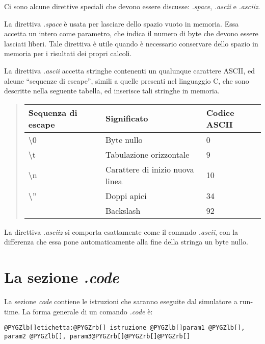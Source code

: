 \documentclass[letterpaper,10pt,english]{sphinxmanual}
\begin{document}
Ci sono alcune direttive speciali che devono essere discusse: \emph{.space},
\emph{.ascii} e \emph{.asciiz}.

La direttiva \emph{.space} è usata per lasciare dello spazio vuoto in memoria.
Essa accetta un intero come parametro, che indica il numero di byte che devono
essere lasciati liberi.  Tale direttiva è utile quando è necessario conservare
dello spazio in memoria per i risultati dei propri calcoli.

La direttiva \emph{.ascii} accetta stringhe contenenti un qualunque carattere
ASCII, ed alcune ``sequenze di escape'', simili a quelle presenti nel linguaggio
C, che sono descritte nella seguente tabella, ed inserisce tali stringhe in
memoria.
\begin{quote}

\begin{tabulary}{\linewidth}{|L|L|L|}
\hline
\textbf{
Sequenza di escape
} & \textbf{
Significato
} & \textbf{
Codice ASCII
}\\
\hline

\textbackslash{}0
 & 
Byte nullo
 & 
0
\\

\textbackslash{}t
 & 
Tabulazione orizzontale
 & 
9
\\

\textbackslash{}n
 & 
Carattere di inizio nuova linea
 & 
10
\\

\textbackslash{}''
 & 
Doppi apici
 & 
34
\\
 & 
Backslash
 & 
92
\\
\hline
\end{tabulary}

\end{quote}

La direttiva \emph{.asciiz} si comporta esattamente come il comando \emph{.ascii}, con
la differenza che essa pone automaticamente alla fine della stringa un byte
nullo.


\section{La sezione \emph{.code}}
\label{source-files-format:la-sezione-code}
La sezione \emph{code} contiene le istruzioni che saranno eseguite dal
simulatore a run-time. La forma generale di un comando \emph{.code} è:

\begin{Verbatim}[commandchars=@\[\]]
@PYGZlb[]etichetta:@PYGZrb[] istruzione @PYGZlb[]param1 @PYGZlb[], param2 @PYGZlb[], param3@PYGZrb[]@PYGZrb[]@PYGZrb[]
\end{Verbatim}
\end{document}
